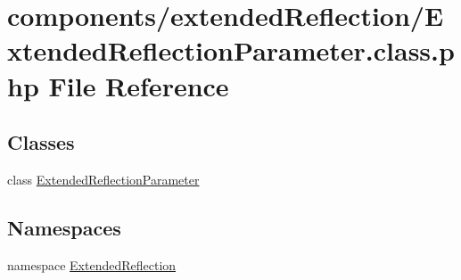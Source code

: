 \hypertarget{_extended_reflection_parameter_8class_8php}{
\section{components/extendedReflection/ExtendedReflectionParameter.class.php File Reference}
\label{_extended_reflection_parameter_8class_8php}
}
\subsection*{Classes}
\begin{CompactItemize}
\item 
class \hyperlink{class_extended_reflection_parameter}{ExtendedReflectionParameter}
\end{CompactItemize}
\subsection*{Namespaces}
\begin{CompactItemize}
\item 
namespace \hyperlink{namespace_extended_reflection}{ExtendedReflection}
\end{CompactItemize}
